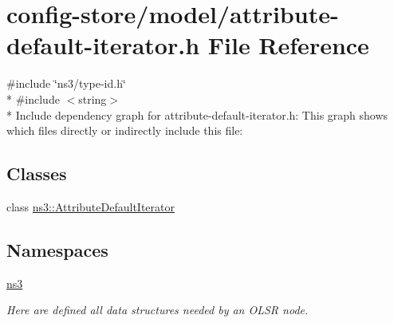 \hypertarget{attribute-default-iterator_8h}{}\section{config-\/store/model/attribute-\/default-\/iterator.h File Reference}
\label{attribute-default-iterator_8h}
{\ttfamily \#include \char`\"{}ns3/type-\/id.\+h\char`\"{}}\\*
{\ttfamily \#include $<$string$>$}\\*
Include dependency graph for attribute-\/default-\/iterator.h\+:
This graph shows which files directly or indirectly include this file\+:
\subsection*{Classes}
\begin{DoxyCompactItemize}
\item 
class \hyperlink{classns3_1_1AttributeDefaultIterator}{ns3\+::\+Attribute\+Default\+Iterator}
\end{DoxyCompactItemize}
\subsection*{Namespaces}
\begin{DoxyCompactItemize}
\item 
 \hyperlink{namespacens3}{ns3}
\begin{DoxyCompactList}\small\item\em Here are defined all data structures needed by an O\+L\+SR node. \end{DoxyCompactList}\end{DoxyCompactItemize}
